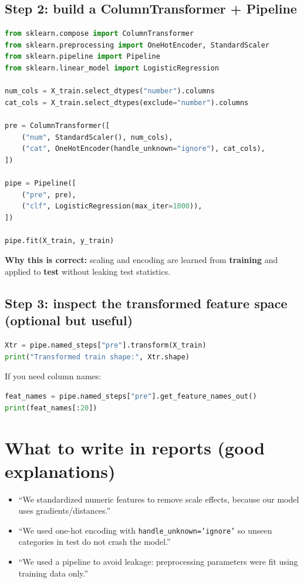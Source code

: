 \documentclass[11pt]{article}
\begin{document}
\subsection{Step 2: build a ColumnTransformer + Pipeline}
\begin{lstlisting}[language=Python]
from sklearn.compose import ColumnTransformer
from sklearn.preprocessing import OneHotEncoder, StandardScaler
from sklearn.pipeline import Pipeline
from sklearn.linear_model import LogisticRegression

num_cols = X_train.select_dtypes("number").columns
cat_cols = X_train.select_dtypes(exclude="number").columns

pre = ColumnTransformer([
    ("num", StandardScaler(), num_cols),
    ("cat", OneHotEncoder(handle_unknown="ignore"), cat_cols),
])

pipe = Pipeline([
    ("pre", pre),
    ("clf", LogisticRegression(max_iter=1000)),
])

pipe.fit(X_train, y_train)
\end{lstlisting}
\textbf{Why this is correct:} scaling and encoding are learned from \textbf{training} and applied to \textbf{test} without leaking test statistics.

\subsection{Step 3: inspect the transformed feature space (optional but useful)}
\begin{lstlisting}[language=Python]
Xtr = pipe.named_steps["pre"].transform(X_train)
print("Transformed train shape:", Xtr.shape)
\end{lstlisting}
If you need column names:
\begin{lstlisting}[language=Python]
feat_names = pipe.named_steps["pre"].get_feature_names_out()
print(feat_names[:20])
\end{lstlisting}

\section{What to write in reports (good explanations)}
\begin{itemize}[leftmargin=*]
  \item ``We standardized numeric features to remove scale effects, because our model uses gradients/distances.''
  \item ``We used one-hot encoding with \texttt{handle\_unknown='ignore'} so unseen categories in test do not crash the model.''
  \item ``We used a pipeline to avoid leakage: preprocessing parameters were fit using training data only.''
\end{itemize}
\end{document}
